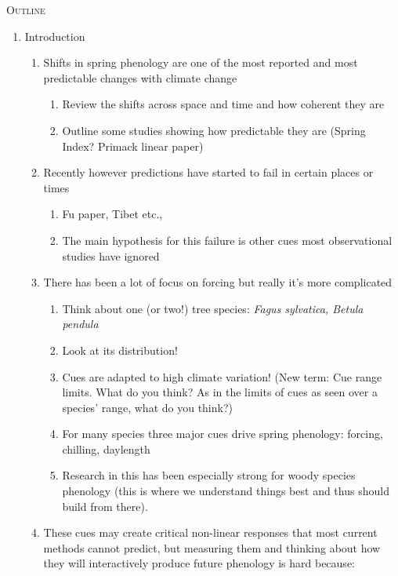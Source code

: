 \documentclass[11pt,letterpaper]{article}
\renewcommand{\section}[1]{%
\bigskip
\begin{center}
\begin{Large}
\normalfont\scshape #1
\medskip
\end{Large}
\end{center}}
\begin{document}
\section{Outline}
\begin{enumerate}
\item Introduction 
\begin{enumerate}
\item Shifts in spring phenology are one of the most reported and most predictable changes with climate change
\begin{enumerate}
\item Review the shifts across space and time and how coherent they are
\item Outline some studies showing how predictable they are (Spring Index? Primack linear paper)
\end{enumerate}
\item Recently however predictions have started to fail in certain places or times
\begin{enumerate}
\item Fu paper, Tibet etc., 
\item The main hypothesis for this failure is other cues most observational studies have ignored
\end{enumerate}
\item There has been a lot of focus on forcing but really it's more complicated
\begin{enumerate}
\item Think about one (or two!) tree species: \emph{Fagus sylvatica, Betula pendula}
\item Look at its distribution!
\item Cues are adapted to high climate variation! (New term: Cue range limits. What do you think? As in the limits of cues as seen over a species' range, what do you think?)
\item For many species three major cues drive spring phenology: forcing, chilling, daylength
\item Research in this has been especially strong for woody species phenology (this is where we understand things best and thus should build from there).
\end{enumerate}
\item These cues may create critical non-linear responses that most current methods cannot predict, but measuring them and thinking about how they will interactively produce future phenology is hard because:

\end{enumerate}
\end{enumerate}
\end{document}
